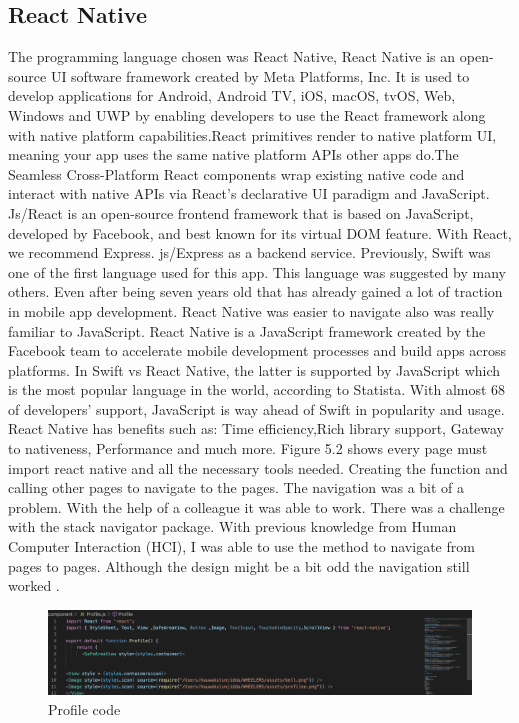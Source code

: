 \documentclass{l4proj}
\begin{document}
\newpage
\subsection{React Native}
The programming language chosen was React Native, React Native is an open-source UI software framework created by Meta Platforms, Inc. It is used to develop applications for Android, Android TV, iOS, macOS, tvOS, Web, Windows and UWP by enabling developers to use the React framework along with native platform capabilities.React primitives render to native platform UI, meaning your app uses the same native platform APIs other apps do.The Seamless Cross-Platform React components wrap existing native code and interact with native APIs via React’s declarative UI paradigm and JavaScript. Js/React is an open-source frontend framework that is based on JavaScript, developed by Facebook, and best known for its virtual DOM feature. With React, we recommend Express. js/Express as a backend service. Previously, Swift was one of the first language used for this app. This language was suggested by many others. Even after being seven years old that has already gained a lot of traction in mobile app development. React Native was easier to navigate also was really familiar to JavaScript. React Native is a JavaScript framework created by the Facebook team to accelerate mobile development processes and build apps across platforms. In Swift vs React Native, the latter is supported by JavaScript which is the most popular language in the world, according to Statista. With almost 68 of developers’ support, JavaScript is way ahead of Swift in popularity and usage. React Native has benefits such as: Time efficiency,Rich library support, Gateway to nativeness, Performance and much more. Figure 5.2 shows every page must import react native and all the necessary tools needed. Creating the function and calling other pages to navigate to the pages. The navigation was a bit of a problem. With the help of a colleague it was able to work. There was a challenge with the stack navigator package. With previous knowledge from Human Computer Interaction (HCI), I was able to use the method to navigate from pages to pages. Although the design might be a bit odd the navigation still worked . 



\begin{figure}
    \centering
     \includegraphics[width=1\textwidth]{images/q.png}
     \caption{Profile code }
    \label{fig:my_label}
\end{figure}
\end{document}
